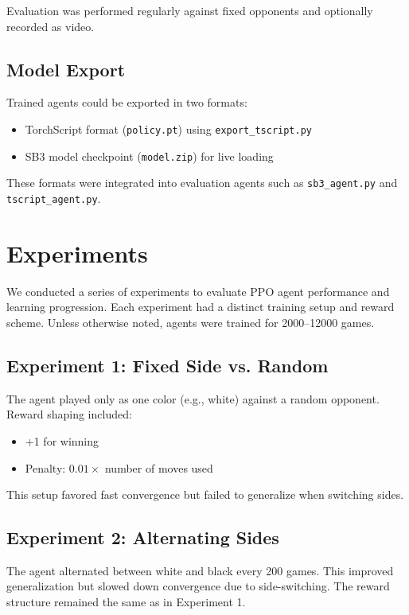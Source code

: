 \documentclass[conference]{IEEEtran}
\begin{document}
Evaluation was performed regularly against fixed opponents and optionally recorded as video.

\subsection{Model Export}

Trained agents could be exported in two formats:
\begin{itemize}
    \item TorchScript format (\texttt{policy.pt}) using \texttt{export\_tscript.py}
    \item SB3 model checkpoint (\texttt{model.zip}) for live loading
\end{itemize}
These formats were integrated into evaluation agents such as \texttt{sb3\_agent.py} and \texttt{tscript\_agent.py}.

\section{Experiments}

We conducted a series of experiments to evaluate PPO agent performance and learning progression. Each experiment had a distinct training setup and reward scheme. Unless otherwise noted, agents were trained for 2000–12000 games.

\subsection{Experiment 1: Fixed Side vs. Random}

The agent played only as one color (e.g., white) against a random opponent. Reward shaping included:
\begin{itemize}
    \item +1 for winning
    \item Penalty: $0.01 \times$ number of moves used
\end{itemize}
This setup favored fast convergence but failed to generalize when switching sides.

\subsection{Experiment 2: Alternating Sides}

The agent alternated between white and black every 200 games. This improved generalization but slowed down convergence due to side-switching. The reward structure remained the same as in Experiment 1.
\end{document}
